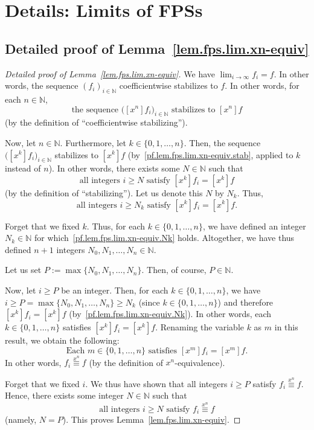 \section{Details: Limits of FPSs}

\subsection{Detailed proof of Lemma~\ref{lem.fps.lim.xn-equiv}}

\begin{proof}[Detailed proof of Lemma~\ref{lem.fps.lim.xn-equiv}]
\leanok
We have $\lim_{i\to\infty} f_i = f$.
In other words, the sequence $(f_i)_{i\in\mathbb{N}}$ coefficientwise
stabilizes to $f$.
In other words, for each $n\in\mathbb{N}$,
\begin{equation}
\text{the sequence } \bigl([x^n] f_i\bigr)_{i\in\mathbb{N}}
\text{ stabilizes to } [x^n] f
\label{pf.lem.fps.lim.xn-equiv.stab}
\end{equation}
(by the definition of ``coefficientwise stabilizing'').

Now, let $n\in\mathbb{N}$. Furthermore, let $k\in\{0,1,\ldots,n\}$.
Then, the sequence $\bigl([x^k] f_i\bigr)_{i\in\mathbb{N}}$ stabilizes
to $[x^k] f$ (by~\eqref{pf.lem.fps.lim.xn-equiv.stab}, applied to $k$
instead of $n$). In other words, there exists some $N\in\mathbb{N}$
such that
\[
\text{all integers } i\geq N \text{ satisfy } [x^k] f_i = [x^k] f
\]
(by the definition of ``stabilizing''). Let us denote this $N$ by $N_k$.
Thus,
\begin{equation}
\text{all integers } i\geq N_k \text{ satisfy } [x^k] f_i = [x^k] f.
\label{pf.lem.fps.lim.xn-equiv.Nk}
\end{equation}

Forget that we fixed $k$. Thus, for each $k\in\{0,1,\ldots,n\}$, we
have defined an integer $N_k\in\mathbb{N}$ for
which~\eqref{pf.lem.fps.lim.xn-equiv.Nk} holds. Altogether, we have
thus defined $n+1$ integers $N_0, N_1, \ldots, N_n \in \mathbb{N}$.

Let us set $P := \max\{N_0, N_1, \ldots, N_n\}$. Then, of course,
$P\in\mathbb{N}$.

Now, let $i\geq P$ be an integer. Then, for each $k\in\{0,1,\ldots,n\}$,
we have $i\geq P = \max\{N_0, N_1, \ldots, N_n\} \geq N_k$ (since
$k\in\{0,1,\ldots,n\}$) and therefore $[x^k] f_i = [x^k] f$
(by~\eqref{pf.lem.fps.lim.xn-equiv.Nk}). In other words, each
$k\in\{0,1,\ldots,n\}$ satisfies $[x^k] f_i = [x^k] f$. Renaming the
variable $k$ as $m$ in this result, we obtain the following:
\[
\text{Each } m\in\{0,1,\ldots,n\} \text{ satisfies } [x^m] f_i = [x^m] f.
\]
In other words, $f_i \overset{x^n}{\equiv} f$ (by the definition of
$x^n$-equivalence).

Forget that we fixed $i$. We thus have shown that all integers $i\geq P$
satisfy $f_i \overset{x^n}{\equiv} f$. Hence, there exists some integer
$N\in\mathbb{N}$ such that
\[
\text{all integers } i\geq N \text{ satisfy }
f_i \overset{x^n}{\equiv} f
\]
(namely, $N = P$). This proves Lemma~\ref{lem.fps.lim.xn-equiv}.
\end{proof}

